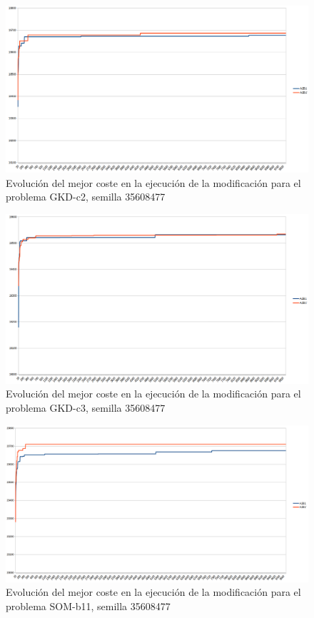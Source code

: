 	\begin{figure}[H]
		\centering
		\includegraphics[scale=0.3]{img/convergenciaGKD2mejora.png}
		\caption{Evolución del mejor coste en la ejecución de la modificación para el problema GKD-c2, semilla 35608477}
		\label{gkd-c2_convergencia_mejora}
	\end{figure}

	\begin{figure}[H]
		\centering
		\includegraphics[scale=0.3]{img/convergenciaGKD3mejora.png}
		\caption{Evolución del mejor coste en la ejecución de la modificación para el problema GKD-c3, semilla 35608477}
		\label{gkd-c3_convergencia_mejora}
	\end{figure}

	\begin{figure}[H]
		\centering
		\includegraphics[scale=0.3]{img/convergenciaSOM1mejora.png}
		\caption{Evolución del mejor coste en la ejecución de la modificación para el problema SOM-b11, semilla 35608477}
		\label{SOM-b_11_convergencia_mejora}
	\end{figure}

